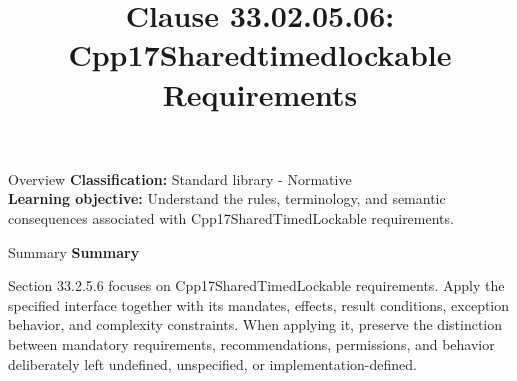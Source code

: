\documentclass[10pt,letterpaper]{article}
\title{Clause 33.02.05.06: Cpp17Sharedtimedlockable Requirements}
\author{}
\date{}
\begin{document}
\maketitle
\begin{CornellOverviewBox}{Overview}
\textbf{Classification:} Standard library - Normative\\[2pt]
\textbf{Learning objective:} Understand the rules, terminology, and semantic consequences associated with Cpp17SharedTimedLockable requirements.
\end{CornellOverviewBox}\begin{CornellSummaryBox}{Summary}
{\sffamily\bfseries\color{Accent} Summary}\par\vspace{3pt}Section 33.2.5.6 focuses on Cpp17SharedTimedLockable requirements. Apply the specified interface together with its mandates, effects, result conditions, exception behavior, and complexity constraints. When applying it, preserve the distinction between mandatory requirements, recommendations, permissions, and behavior deliberately left undefined, unspecified, or implementation-defined.
\end{CornellSummaryBox}
\end{document}
